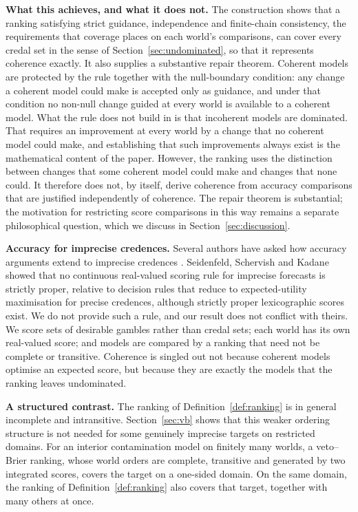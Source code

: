 \documentclass[11pt]{article}
\theoremstyle{plain}
\theoremstyle{definition}
\theoremstyle{remark}
\begin{document}
\smallskip\noindent\textbf{What this achieves, and what it does not.} The construction shows
that a ranking satisfying strict guidance, independence and finite-chain consistency, the
requirements that coverage places on each world's comparisons, can cover every credal set in the
sense of Section~\ref{sec:undominated}, so that it represents coherence exactly. It also supplies a substantive repair
theorem. Coherent models are protected by the rule together with the null-boundary condition:
any change a coherent model could make is accepted only as guidance, and under that condition
no non-null change guided at every world is available to a coherent model. What the rule does
not build in is that incoherent models are dominated. That requires an improvement at every
world by a change that no coherent model could make, and establishing that such improvements
always exist is the mathematical content of the paper. However, the ranking uses the
distinction between changes that some coherent model could make and changes that none could.
It therefore does not, by itself, derive coherence from accuracy comparisons that are
justified independently of coherence. The repair theorem is substantial; the motivation for
restricting score comparisons in this way remains a separate philosophical question, which we
discuss in Section~\ref{sec:discussion}.

\smallskip\noindent\textbf{Accuracy for imprecise credences.} Several authors have asked how
accuracy arguments extend to imprecise credences
\cite{SSK,MayoWilsonWheeler,Schoenfield,Konek,BergerDas}. Seidenfeld, Schervish and Kadane
\cite{SSK} showed that no continuous real-valued scoring rule for imprecise
forecasts is strictly proper, relative to decision rules that reduce to expected-utility
maximisation for precise credences, although strictly proper lexicographic scores exist. We do not provide such a rule, and our result does not conflict
with theirs. We score sets of desirable gambles rather than credal sets; each world has its own
real-valued score; and models are compared by a ranking that need not be complete or
transitive. Coherence is singled out not because coherent models optimise an expected score,
but because they are exactly the models that the ranking leaves undominated.

\smallskip\noindent\textbf{A structured contrast.} The ranking of Definition~\ref{def:ranking}
is in general incomplete and intransitive. Section~\ref{sec:vb} shows that this weaker
ordering structure is not needed for some genuinely imprecise targets on restricted domains.
For an interior contamination model on finitely many worlds, a veto--Brier ranking, whose
world orders are complete, transitive and generated by two integrated scores, covers the
target on a one-sided domain. On the same domain, the ranking of Definition~\ref{def:ranking}
also covers that target, together with many others at once.
\end{document}
